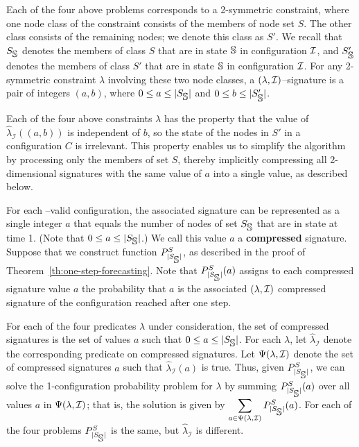 Each of the four above problems corresponds to a 2-symmetric constraint,
where one node class of the constraint
consists of the members of node set $S$. 
The other class consists of the remaining nodes;
we denote this class as $S'$. 
We recall that $S_{\mbox{$\mathbb{S}$}}$ denotes the members of class $S$
that are in state ${\mbox{$\mathbb{S}$}}$ in configuration $\mbox{${\cal I}$}{}$,
and $S'_{\mbox{$\mathbb{S}$}}$ denotes the members of class $S'$
that are in state ${\mbox{$\mathbb{S}$}}$ in configuration $\mbox{${\cal I}$}{}$.
For any 2-symmetric constraint $\lambda$ involving these two node classes,
a $(\lambda,\mbox{${\cal I}$}{})$--signature is a pair of
integers $(a, b)$, where $0 \leq a \leq |S_{\mbox{$\mathbb{S}$}}|$ and $0 \leq b \leq |S'_{\mbox{$\mathbb{S}$}}|$. 

Each of the four above  constraints $\lambda$ has the property that
the value of $\widehat{\lambda}_{\mathcal{I}}((a,b))$
is independent of $b$, so the state of the nodes in $S'$ in a configuration $C$ is irrelevant.
This property enables us to simplify the algorithm by processing only the members of set $S$,
thereby implicitly compressing all 2-dimensional signatures with the same value of $a$
into a single value, as described below.

For each \cali{}--valid configuration,
the associated signature 
can be represented as a single integer $a$ that
equals the number of nodes of set $S_{\mbox{$\mathbb{S}$}}$  
that are in state \istate{} at time 1.
(Note that $0 \leq a \leq |S_{\mbox{$\mathbb{S}$}}|$.)
We call this value $a$ a {\bf compressed} signature.
Suppose that we construct function $P_{|S_{\mbox{$\mathbb{S}$}}|}^S$,
as described in the proof of Theorem~\ref{th:one-step-forecasting}.
Note that $P_{|S_{\mbox{$\mathbb{S}$}}|}^S(a)$
assigns to each compressed
signature value $a$
the probability that $a$ is the
associated $(\lambda,\mbox{${\cal I}$}{})$ compressed signature of the configuration
reached after one step.

For each of the four predicates $\lambda$ under consideration,
the set of compressed signatures is the set of values 
$a$ such that $0 \leq a \leq |S_{\mbox{$\mathbb{S}$}}|$.
For each $\lambda$, let $\widehat{\lambda}_{\mathcal{I}}$ denote the corresponding
predicate on compressed signatures.
Let $\Psi(\lambda, \mbox{${\cal I}$})$ denote the set of compressed signatures $a$
such that $\widehat{\lambda}_{\mathcal{I}}(a)$ is true.
Thus, given $P_{|S_{\mbox{$\mathbb{S}$}}|}^S$, we can solve the 
1-configuration probability problem for $\lambda$
by summing $P_{|S_{\mbox{$\mathbb{S}$}}|}^S(a)$ over all 
values $a$ in $\Psi(\lambda, \mbox{${\cal I}$})$;
that is, the solution is given by 
$\displaystyle{\sum_{a \in \Psi(\lambda, \mathcal{I})} P_{|S_{\mbox{$\mathbb{S}$}}|}^S(a)}$.
For each of the four problems $P_{|S_{\mbox{$\mathbb{S}$}}|}^S$ is the same, 
but $\widehat{\lambda}_{\mathcal{I}}$ is different.

